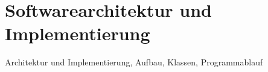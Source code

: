 \chapter{Softwarearchitektur und Implementierung}
Architektur und Implementierung, Aufbau, Klassen, Programmablauf

